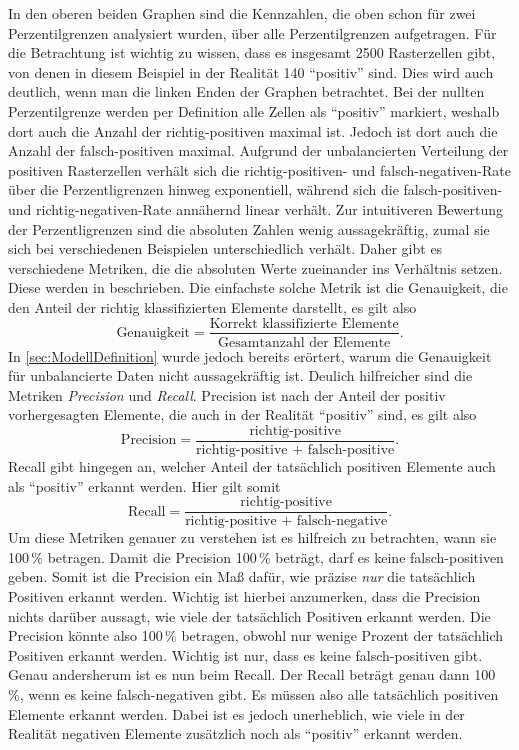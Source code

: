 In den oberen beiden Graphen sind die Kennzahlen, die oben schon für zwei Perzentilgrenzen analysiert wurden, über alle Perzentilgrenzen aufgetragen.
Für die Betrachtung ist wichtig zu wissen, dass es insgesamt 2500 Rasterzellen gibt, von denen in diesem Beispiel in der Realität 140 "`positiv"' sind.
Dies wird auch deutlich, wenn man die linken Enden der Graphen betrachtet.
Bei der nullten Perzentilgrenze werden per Definition alle Zellen als "`positiv"' markiert, weshalb dort auch die Anzahl der richtig-positiven maximal ist.
Jedoch ist dort auch die Anzahl der falsch-positiven maximal.
Aufgrund der unbalancierten Verteilung der positiven Rasterzellen verhält sich die richtig-positiven- und falsch-negativen-Rate über die Perzentligrenzen hinweg exponentiell, während sich die falsch-positiven- und richtig-negativen-Rate annähernd linear verhält.
Zur intuitiveren Bewertung der Perzentligrenzen sind die absoluten Zahlen wenig aussagekräftig, zumal sie sich bei verschiedenen Beispielen unterschiedlich verhält.
Daher gibt es verschiedene Metriken, die die absoluten Werte zueinander ins Verhältnis setzen.
Diese werden in \cite{ImbalancedData} beschrieben.
Die einfachste solche Metrik ist die Genauigkeit, die den Anteil der richtig klassifizierten Elemente darstellt, es gilt also
$$
\text{Genauigkeit} = \frac{\text{Korrekt klassifizierte Elemente}}{\text{Gesamtanzahl der Elemente}}.
$$
In \autoref{sec:ModellDefinition} wurde jedoch bereits erörtert, warum die Genauigkeit für unbalancierte Daten nicht aussagekräftig ist.
Deulich hilfreicher sind die Metriken \emph{Precision} und \emph{Recall}.
Precision ist nach \cite{ImbalancedData} der Anteil der positiv vorhergesagten Elemente, die auch in der Realität "`positiv"' sind, es gilt also
$$
\text{Precision} = \frac{\text{richtig-positive}}{\text{richtig-positive + falsch-positive}}.
$$
Recall gibt hingegen an, welcher Anteil der tatsächlich positiven Elemente auch als "`positiv"' erkannt werden.
Hier gilt somit
$$
\text{Recall} = \frac{\text{richtig-positive}}{\text{richtig-positive + falsch-negative}}.
$$
Um diese Metriken genauer zu verstehen ist es hilfreich zu betrachten, wann sie 100\,\% betragen.
Damit die Precision 100\,\% beträgt, darf es keine falsch-positiven geben.
Somit ist die Precision ein Maß dafür, wie präzise \emph{nur} die tatsächlich Positiven erkannt werden.
Wichtig ist hierbei anzumerken, dass die Precision nichts darüber aussagt, wie viele der tatsächlich Positiven erkannt werden.
Die Precision könnte also 100\,\% betragen, obwohl nur wenige Prozent der tatsächlich Positiven erkannt werden.
Wichtig ist nur, dass es keine falsch-positiven gibt.
Genau andersherum ist es nun beim Recall.
Der Recall beträgt genau dann 100\,\%, wenn es keine falsch-negativen gibt.
Es müssen also alle tatsächlich positiven Elemente erkannt werden.
Dabei ist es jedoch unerheblich, wie viele in der Realität negativen Elemente zusätzlich noch als "`positiv"' erkannt werden.

